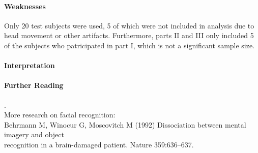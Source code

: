 \documentclass[11pt]{article}
\begin{document}
\paragraph{Weaknesses}
Only 20 test subjects were used, 5 of which were not included in analysis due to
head movement or other artifacts.  Furthermore, parts II and III only included
5 of the subjects who patricipated in part I, which is not a significant sample
size.

\paragraph{Interpretation}


\paragraph{Further Reading} \tiny{.}\\
\normalsize
More research on facial recognition: \\
\hspace*{0.5in} Behrmann M, Winocur G, Moscovitch M (1992) Dissociation between mental imagery and object \\
\hspace*{0.5in} recognition in a brain-damaged patient. Nature 359:636–637.\\
\end{document}

